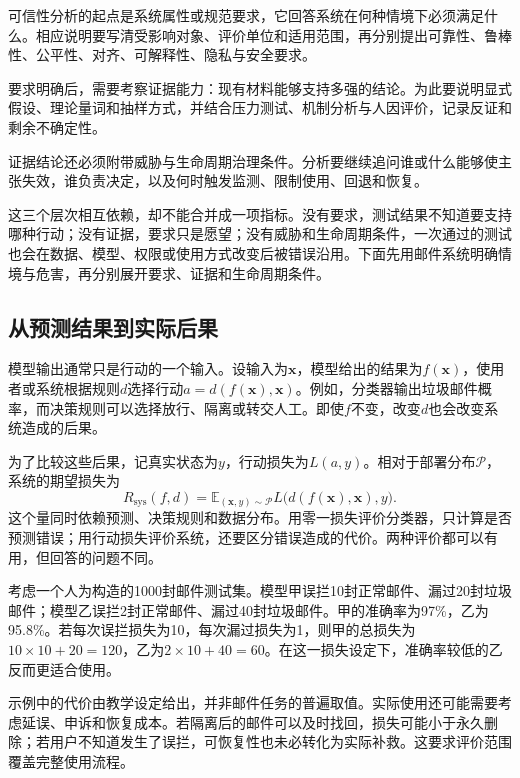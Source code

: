 可信性分析的起点是系统属性或规范要求，它回答系统在何种情境下必须满足什么。相应说明要写清受影响对象、评价单位和适用范围，再分别提出可靠性、鲁棒性、公平性、对齐、可解释性、隐私与安全要求。

要求明确后，需要考察证据能力：现有材料能够支持多强的结论。为此要说明显式假设、理论量词和抽样方式，并结合压力测试、机制分析与人因评价，记录反证和剩余不确定性。

证据结论还必须附带威胁与生命周期治理条件。分析要继续追问谁或什么能够使主张失效，谁负责决定，以及何时触发监测、限制使用、回退和恢复。

这三个层次相互依赖，却不能合并成一项指标。没有要求，测试结果不知道要支持哪种行动；没有证据，要求只是愿望；没有威胁和生命周期条件，一次通过的测试也会在数据、模型、权限或使用方式改变后被错误沿用。下面先用邮件系统明确情境与危害，再分别展开要求、证据和生命周期条件。

\subsection{从预测结果到实际后果}

模型输出通常只是行动的一个输入。设输入为$\bm{x}$，模型给出的结果为$f(\bm{x})$，使用者或系统根据规则$d$选择行动$a=d(f(\bm{x}),\bm{x})$。例如，分类器输出垃圾邮件概率，而决策规则可以选择放行、隔离或转交人工。即使$f$不变，改变$d$也会改变系统造成的后果。

为了比较这些后果，记真实状态为$y$，行动损失为$L(a,y)$。相对于部署分布$\mathcal P$，系统的期望损失为
\begin{equation}
 R_{\mathrm{sys}}(f,d)
 =\mathbb E_{(\bm{x},y)\sim\mathcal P}
 L\bigl(d(f(\bm{x}),\bm{x}),y\bigr).
 \label{eq:trust-system-risk}
\end{equation}
这个量同时依赖预测、决策规则和数据分布。用零一损失评价分类器，只计算是否预测错误；用行动损失评价系统，还要区分错误造成的代价。两种评价都可以有用，但回答的问题不同。

\begin{example}[准确率与行动损失]
\label{ex:trust-mail-cost}
考虑一个人为构造的1000封邮件测试集。模型甲误拦10封正常邮件、漏过20封垃圾邮件；模型乙误拦2封正常邮件、漏过40封垃圾邮件。甲的准确率为97\%，乙为95.8\%。若每次误拦损失为10，每次漏过损失为1，则甲的总损失为$10\times10+20=120$，乙为$2\times10+40=60$。在这一损失设定下，准确率较低的乙反而更适合使用。
\end{example}

示例中的代价由教学设定给出，并非邮件任务的普遍取值。实际使用还可能需要考虑延误、申诉和恢复成本。若隔离后的邮件可以及时找回，损失可能小于永久删除；若用户不知道发生了误拦，可恢复性也未必转化为实际补救。这要求评价范围覆盖完整使用流程。

